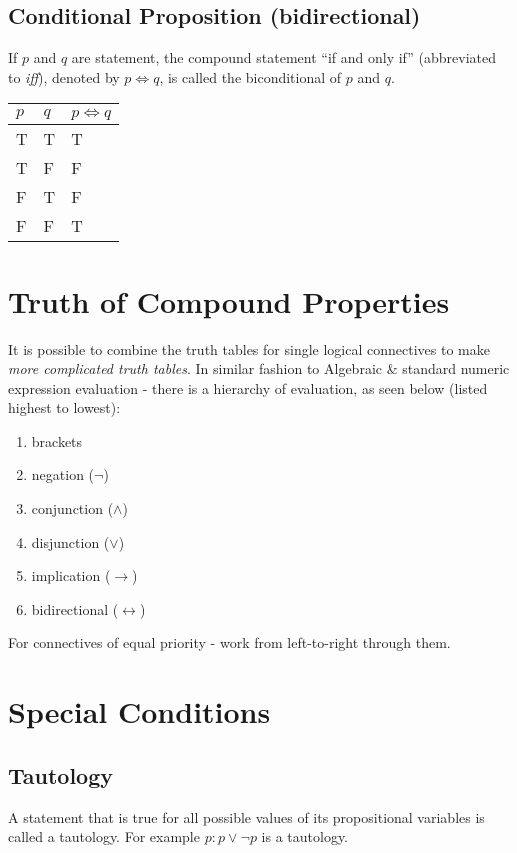 \subsection{Conditional Proposition (bidirectional)}
If $p$ and $q$ are statement, the compound statement ``if and only if'' (abbreviated to \textit{iff}), denoted by $p \Leftrightarrow q$, is called the biconditional of $p$ and $q$. 
\begin{table}[H]
    \centering
    \begin{tabular}{C{0.1\textwidth} C{0.1\textwidth} C{0.1\textwidth}}
        $p$ & $q$ & $p \Leftrightarrow q$\\
        \hline
        \hline
        T & T & T\\
        \hline
        T & F & F \\
        \hline
        F & T & F \\
        \hline
        F & F & T\\
        \hline
    \end{tabular}
\end{table}

\section{Truth of Compound Properties}
It is possible to combine the truth tables for single logical connectives to make \textit{more complicated truth tables}. In similar fashion to Algebraic \& standard numeric expression evaluation - there is a hierarchy of evaluation, as seen below (listed highest to lowest):
\begin{enumerate}
    \item brackets
    \item negation ($¬$)
    \item conjunction ($\wedge$)
    \item disjunction ($\vee$)
    \item implication ($\rightarrow$)
    \item bidirectional ($\leftrightarrow$)
\end{enumerate}
For connectives of equal priority - work from left-to-right through them.

\section{Special Conditions}
\subsection{Tautology}
A statement that is true for all possible values of its propositional variables is called a tautology. For example $p: p \vee ¬ p$ is a tautology.
